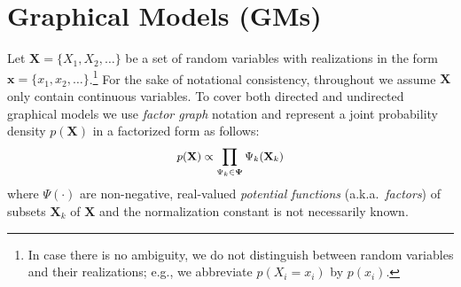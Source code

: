 \documentclass{article} %
\renewcommand{\vec}[1]{\mathbf{#1}}
\newcommand{\bvec}[1]{\textbf{#1}}
\newcommand{\pr}{p}
\begin{document}

\section{Graphical Models (GMs)}
\label{sect:background}
Let $\vec{X} = \{X_1, X_2, \ldots\}$ be a set of random variables with realizations in the form 
$\vec{x} = \{x_1, x_2, \ldots\}$.\footnote{
In case there is no ambiguity, we do not distinguish between random variables and their realizations; e.g., we abbreviate $\pr(X_i = x_i)$ by $\pr(x_i)$.}
For the sake of notational consistency, 
throughout we assume $\vec{X}$ only contain continuous variables. 
To cover both directed and undirected graphical models we use
\emph{factor graph} notation \cite{kschischang2001factor}
and represent a joint probability density $\pr(\vec{X})$ in a factorized form as follows: 
\begin{equation} \footnotesize
\label{e:factor-graph}
\pr(\vec{X}) \propto \prod_{\Psi_k \in \boldsymbol\Psi} \Psi_k (\vec{X}_k)
\end{equation}
where 
$\Psi(\cdot)$ are non-negative, real-valued \emph{potential functions} 
(a.k.a.\ \emph{factors}) of subsets $\bvec{X}_k$ of $\bvec{X}$ 
 and the normalization constant is not necessarily known.
\end{document}

